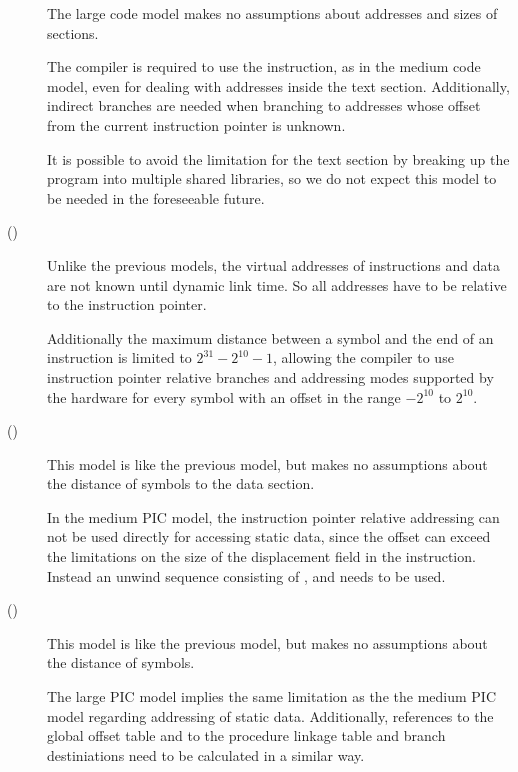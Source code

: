 \begin{description}
\item[]
  
  The large code model makes no assumptions about addresses and sizes
  of sections.
  
  The compiler is required to use the  instruction, as in
  the medium code model, even for dealing with addresses inside the
  text section.  Additionally, indirect branches are needed when
  branching to addresses whose offset from the current instruction
  pointer is unknown.
  
  It is possible to avoid the limitation for the text section by
  breaking up the program into multiple shared libraries, so we do not
  expect this model to be needed in the foreseeable future.

\item[ ()]
  
  Unlike the previous models, the virtual addresses of instructions
  and data are not known until dynamic link time.  So all addresses
  have to be relative to the instruction pointer.
  
  Additionally the maximum distance between a symbol and the end of an
  instruction is limited to $2^{31}-2^{10}-1$, allowing the compiler
  to use instruction pointer relative branches and addressing modes
  supported by the hardware for every symbol with an offset in the
  range $-2^{10}$ to $2^{10}$.

\item[
  ()]
  
  This model is like the previous model, but makes no assumptions
  about the distance of symbols to the data section.
  
  In the medium PIC model, the instruction pointer relative addressing
  can not be used directly for accessing static data, since the offset
  can exceed the limitations on the size of the displacement field in
  the instruction.  Instead an unwind sequence consisting of
  ,  and  needs to be used.

\item[
  ()]
  
  This model is like the previous model, but makes no assumptions
  about the distance of symbols.
  
  The large PIC model implies the same limitation as the the medium
  PIC model regarding addressing of static data.  Additionally,
  references to the global offset table and to the procedure linkage
  table and branch destiniations need to be calculated in a similar
  way.

\end{description}

